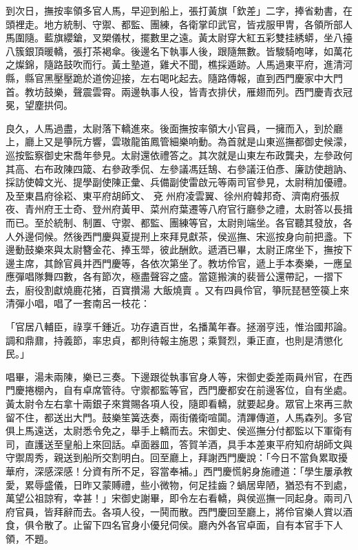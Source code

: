 \begin{showcontents}{}
到次日，撫按率領多官人馬，早迎到船上，張打黃旗「欽差」二字，捧省勅書，在頭裡走。地方統制、守禦、都監、團練，各衛掌印武官，皆戎服甲冑，各領所部人馬圍隨。藍旗纓鎗，叉槊儀杖，擺數里之遠。黃太尉穿大紅五彩雙挂綉蟒，坐八擡八簇銀頂暖轎，張打茶褐傘。後邊名下執事人後，跟隨無數。皆駿騎咆哮，如萬花之燦錦，隨路鼓吹而行。黃土塾道，雞犬不聞，樵採遁跡。人馬過東平府，進清河縣，縣官黑壓壓跪於道傍迎接，左右喝叱起去。隨路傳報，直到西門慶家中大門首。教坊鼓樂，聲震雲霄。兩邊執事人役，皆青衣排伏，雁翅而列。西門慶青衣冠冕，望塵拱伺。

良久，人馬過盡，太尉落下轎進來。後面撫按率領大小官員，一擁而入，到於廳上，廳上又是箏阮方響，雲璈龍笛鳳管細樂响動。為首就是山東巡撫都御史候濛，巡按監察御史宋喬年參見。太尉還依禮答之。其次就是山東左布政龔夬，左參政何其高、右布政陳四箴、右參政季侃、左參議馮廷鵠、右參議汪伯彥、廉訪使趙訥、採訪使韓文光、提學副使陳正彙、兵備副使雷啟元等兩司官參見，太尉稍加優禮。及至東昌府徐崧、東平府胡師文、
兗 %
州府凌雲翼、徐州府韓邦奇、濟南府張叔夜、青州府王士奇、登州府黃甲、菜州府葉遷等八府官行廳參之禮，太尉答以長揖而已。至於統制、制置、守禦、都監、團練等官，太尉則端坐。各官聽其發放，各人外邊伺候。然後西門慶與夏提刑上來拜見獻茶，侯巡撫、宋巡按身向前把盞。下邊動鼓樂來與太尉簪金花、捧玉斝，彼此酬飲。遞酒已畢，太尉正席坐下，撫按下邊主席，其餘官員并西門慶等，各依次第坐了。教坊伶官，遞上手本奏樂，一應呈應彈唱隊舞四數，各有節次，極盡聲容之盛。當筵搬演的裴晉公還帶記，一摺下去，廚役割獻燒鹿花猪，百寶攢湯 大飯燒賣 。又有四員伶官，箏阮琵琶箜篌上來清彈小唱，唱了一套南呂一枝花：

「官居八輔臣，祿享千鍾近。功存遺百世，名播萬年春。拯溺亨迍，惟治國邦論。調和鼎鼐，持義節，率忠貞，都則待報主施恩；乘賢烈，秉正直，也則是清懲化民。」

唱畢，湯未兩陳，樂已三奏。下邊跟從執事官身人等，宋御史委差兩員州官，在西門慶捲棚內，自有卓席管待。守禦都監等官，西門慶都安在前邊客位，自有坐處。黃太尉令左右拿十兩銀子來賞賜各項人役，隨即看轎，就要起身。眾官上來再三款留不住，都送出大門。鼓樂笙簧迭奏，兩街儀衛喧闐。清蹕傳道，人馬森列。多官俱上馬遠送，太尉悉令免之，舉手上轎而去。宋御史、侯巡撫分付都監以下軍衛有司，直護送至皇船上來回話。卓面器皿，答賀羊酒，具手本差東平府知府胡師文與守禦周秀，親送到船所交割明白。回至廳上，拜謝西門慶說：「今日不當負累取擾華府，深感深感！分資有所不足，容當奉補。」西門慶慌躬身施禮道：「學生屢承教愛，累辱盛儀，日昨又蒙賻禮，些小微物，何足挂齒？蝸居卑陋，猶恐有不到處，萬望公祖諒宥，幸甚！」宋御史謝畢，即令左右看轎，與侯巡撫一同起身。兩司八府官員，皆拜辭而去。各項人役，一鬨而散。西門慶回至廳上，將伶官樂人賞以酒食，俱令散了。止留下四名官身小優兒伺侯。廳內外各官卓面，自有本官手下人領，不題。


\end{showcontents}

